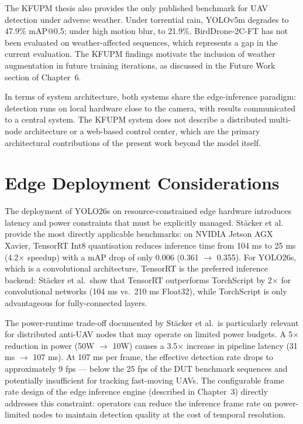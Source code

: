 \documentclass[12pt,a4paper]{report}
\begin{document}
The KFUPM thesis also provides the only published benchmark for UAV
detection under adverse weather. Under torrential rain, YOLOv5m degrades
to 47.9\% mAP@0.5; under high motion blur, to 21.9\%. BirdDrone-2C-FT
has not been evaluated on weather-affected sequences, which represents
a gap in the current evaluation. The KFUPM findings motivate the
inclusion of weather augmentation in future training iterations, as
discussed in the Future Work section of Chapter~6.

In terms of system architecture, both systems share the edge-inference
paradigm: detection runs on local hardware close to the camera, with
results communicated to a central system. The KFUPM system does not
describe a distributed multi-node architecture or a web-based control
center, which are the primary architectural contributions of the present
work beyond the model itself.

\section{Edge Deployment Considerations}

The deployment of YOLO26s on resource-constrained edge hardware introduces
latency and power constraints that must be explicitly managed. Stäcker et al.~\cite{stacker2021}
provide the most directly applicable benchmarks: on NVIDIA Jetson AGX Xavier,
TensorRT Int8 quantisation reduces inference time from 104 ms to 25 ms
(4.2$\times$ speedup) with a mAP drop of only 0.006 (0.361 $\to$ 0.355).
For YOLO26s, which is a convolutional architecture, TensorRT is the preferred
inference backend: Stäcker et al.\ show that TensorRT outperforms TorchScript
by 2$\times$ for convolutional networks (104 ms vs.\ 210 ms Float32), while
TorchScript is only advantageous for fully-connected layers.

The power-runtime trade-off documented by Stäcker et al.\ is particularly
relevant for distributed anti-UAV nodes that may operate on limited power
budgets. A 5$\times$ reduction in power (50W $\to$ 10W) causes a 3.5$\times$
increase in pipeline latency (31 ms $\to$ 107 ms). At 107 ms per frame, the
effective detection rate drops to approximately 9 fps --- below the 25 fps
of the DUT benchmark sequences and potentially insufficient for tracking
fast-moving UAVs. The configurable frame rate design of the edge inference
engine (described in Chapter~3) directly addresses this constraint: operators
can reduce the inference frame rate on power-limited nodes to maintain
detection quality at the cost of temporal resolution.
\end{document}

